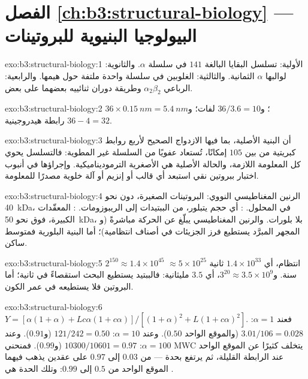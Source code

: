 \section*{الفصل \ref{ch:b3:structural-biology} --- البيولوجيا البنيوية للبروتينات}

\begin{solution}{exo:b3:structural-biology:1}
الأولية: تسلسل البقايا البالغة $141$ في سلسلة $\alpha$.
والثانوية: لوالبها $\alpha$ الثمانية. والثالثية:  الغلوبين في سلسلة
واحدة ملتفة حول هيمها. والرابعية: الرباعي $\alpha_{2}\beta_{2}$
وطريقة دوران ثنائييه بعضهما على بعض.
\end{solution}

\begin{solution}{exo:b3:structural-biology:2}
$36\times \qty{0.15}{nm} = \qty{5.4}{nm}$؛ و$36/3.6 = 10$ لفات؛
و$36 - 4 = 32$ رابطة هيدروجينية.
\end{solution}

\begin{solution}{exo:b3:structural-biology:3}
أن البنية الأصلية، بما فيها الازدواج الصحيح لأربع
روابط كبريتية من بين $105$ إمكانًا، تُستعاد عفويًا من
السلسلة غير المطوية: فالتسلسل يحوي كل المعلومة اللازمة،
والحالة الأصلية هي الأصغرية الترموديناميكية. وإجراؤها في أنبوب
اختبار ببروتين نقي استبعد أي قالب أو إنزيم أو آلة
خلوية مصدرًا للمعلومة.
\end{solution}

\begin{solution}{exo:b3:structural-biology:4}
الرنين المغناطيسي النووي: البروتينات الصغيرة، دون نحو \qty{40}{kDa}، في المحلول.
: أي حجم يتبلور، من الببتيدات إلى
الريبوزومات. : المعقّدات الكبيرة، فوق نحو
\qty{50}{kDa}، بلا بلورات. والرنين المغناطيسي يبلّغ عن الحركة مباشرةً (و
المجهر المبرَّد يستطيع فرز الجزيئات في أصناف انتظامية)؛ أما البنية البلورية
فمتوسط ساكن.
\end{solution}

\begin{solution}{exo:b3:structural-biology:5}
$2^{150} \approx 1.4\times 10^{45}$ انتظام، أي $1.4\times 10^{33}$
ثانية $\approx 5\times 10^{25}$ سنة. و$3^{20} \approx 3.5\times 10^{9}$،
أي $3.5$ مليثانية: فالببتيد يستطيع البحث استقصاءً في ثانية؛ أما
البروتين فلا يستطيعه في عمر الكون.
\end{solution}

\begin{solution}{exo:b3:structural-biology:6}
$Y = [\alpha(1+\alpha) + Lc\alpha(1+c\alpha)]/[(1+\alpha)^{2} +
L(1+c\alpha)^{2}]$. فعند $\alpha = 1$: $3.01/106 = 0.028$ (والموقع الواحد
$0.50$). وعند $\alpha = 10$: $121/242 = 0.50$ (و$0.91$). وعند $\alpha = 100$:
$\num{10300}/\num{10601} = 0.97$ (و$0.99$). فمنحني MWC يتخلف كثيرًا
عن الموقع الواحد عند الرابطة القليلة، ثم يرتفع بحدة --- من $0.03$
إلى $0.97$ على عقدين يذهب فيهما الموقع الواحد من $0.5$ إلى
$0.99$: وتلك الحدة هي .
\end{solution}

